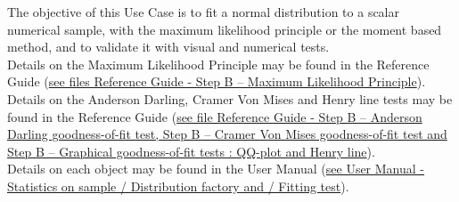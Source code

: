 \renewcommand{\filename}{docUC_InputWithData_NormalFittingTests.tex}
\renewcommand{\filetitle}{UC : Normal distribution fitting test, visual validation tests (Henry line) and numerical validation tests in extreme zones (Anderson Darling test and Cramer Von Mises test)}

\HeaderIIILevel



The objective of this Use Case is to fit a normal distribution to a scalar numerical sample, with the maximum likelihood principle or the moment based method, and to validate it with visual and numerical tests.\\

Details on the Maximum Likelihood  Principle may be found in the Reference Guide (\href{OpenTURNS_ReferenceGuide.pdf}{see files Reference Guide - Step B -- Maximum Likelihood  Principle}).\\

Details on the Anderson Darling, Cramer Von Mises and Henry line tests  may be found in the Reference Guide (\href{OpenTURNS_ReferenceGuide.pdf}{see file Reference Guide - Step B -- Anderson Darling goodness-of-fit test, Step B -- Cramer Von Mises goodness-of-fit test and Step B -- Graphical goodness-of-fit tests : QQ-plot and Henry line}).\\

Details on each object may be found in the User Manual  (\href{OpenTURNS_UserManual_TUI.pdf}{see User Manual - Statistics on sample / Distribution factory and / Fitting test}).\\


